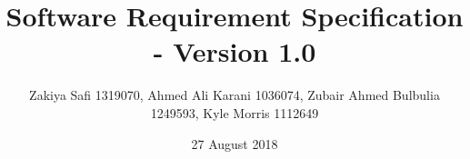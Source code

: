 \documentclass{report}
\begin{document}
 
 \title{Software Requirement Specification - Version 1.0}
 \author{Zakiya Safi 1319070, Ahmed Ali Karani 1036074, Zubair Ahmed Bulbulia 1249593, Kyle Morris 1112649}
 \date{27 August 2018}
 
 
\end{document}
